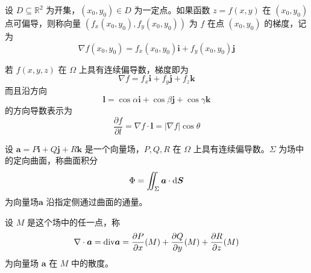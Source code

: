 \documentclass{ctexbook}
\def\diff{\textnormal{d}}
\begin{document}
\begin{definition}[梯度]
    设 $D\subseteq\mathbb{R}^2$ 为开集，$(x_0,y_0)\in D$ 为一定点。如果函数 $z=f(x,y)$ 在 $(x_0,y_0)$ 点可偏导，则称向量 $(f_x(x_0,y_0),f_y(x_0,y_0))$ 为 $f$ 在点 $(x_0,y_0)$ 的梯度，记为
    \begin{equation}
        \nabla f(x_0,y_0) = f_x(x_0,y_0)\boldsymbol{i}+f_y(x_0,y_0)\boldsymbol{j}
    \end{equation}
\end{definition}

\begin{proposition}[梯度与方向导数的关系]
    若 $f(x,y,z)$ 在 $\Omega$ 上具有连续偏导数，梯度即为
    \begin{equation}
        \nabla f=f_x\boldsymbol{i}+f_y\boldsymbol{j}+f_z\boldsymbol{k}
    \end{equation} 
    而且沿方向
    \begin{equation}
        \boldsymbol{l}=\cos\alpha\boldsymbol{i}+\cos\beta\boldsymbol{j}+\cos\gamma\boldsymbol{k}
    \end{equation}
    的方向导数表示为
    \begin{equation}
        \frac{\partial f}{\partial l}=\nabla f\cdot\boldsymbol{l}=|\nabla f|\cos\theta
    \end{equation}
\end{proposition}

\begin{definition}[散度]
    设 $\boldsymbol{a}=P\boldsymbol{i}+Q\boldsymbol{j}+R\boldsymbol{k}$ 是一个向量场，$P,Q,R$ 在 $\Omega$ 上具有连续偏导数。$\Sigma$ 为场中的定向曲面，称曲面积分
    \begin{equation}
        \Phi=\iint_\Sigma\boldsymbol{a}\cdot\diff\boldsymbol{S}
    \end{equation}
    为向量场$\boldsymbol{a}$ 沿指定侧通过曲面的通量。
    
    设 $M$ 是这个场中的任一点，称
    \begin{equation}
        \nabla\cdot\boldsymbol{a}=\textnormal{div}\boldsymbol{a}=\frac{\partial P}{\partial x}(M)+\frac{\partial Q}{\partial y}(M)+\frac{\partial R}{\partial z}(M)
    \end{equation}
    为向量场 $\boldsymbol{a}$ 在 $M$ 中的散度。
\end{definition}
\end{document}
